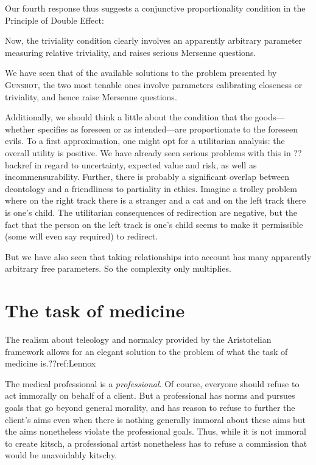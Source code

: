 Our fourth response thus suggests a conjunctive proportionality condition in the Principle of Double Effect:

Now, the triviality condition clearly involves an apparently arbitrary parameter measuring relative triviality, and raises serious 
Mersenne questions. 

We have seen that of the available solutions to the problem presented by \textsc{Gunshot}, the two most tenable ones involve 
parameters calibrating closeness or triviality, and hence raise Mersenne questions.

Additionally, we should think a little about the condition that the goods---whether specifies as foreseen or as intended---are 
proportionate to the foreseen evils. To a first approximation, one might opt for a utilitarian analysis: the overall
utility is positive. We have already seen serious problems with this in ??backref in regard to uncertainty, expected value
and risk, as well as incommensurability. Further, there is probably a significant overlap between deontology and a friendliness
to partiality in ethics. Imagine a trolley problem where on the right track there is a stranger and a cat and on the left track
there is one's child. The utilitarian consequences of redirection are negative, but the fact that the person on the left track
is one's child seems to make it permissible (some will even say required) to redirect. 

But we have also seen that taking relationships into account has many apparently arbitrary free parameters. So 
the complexity only multiplies.

\section{The task of medicine}
The realism about teleology and normalcy provided by the Aristotelian framework
allows for an elegant solution to the problem of what the task of medicine is.??ref:Lennox

The medical professional is a \textit{professional}. Of course, everyone should refuse to act immorally on behalf of a client. But a professional has norms
and pursues goals that go beyond general morality, and has reason to refuse to further the client's aims even when there is nothing generally immoral about
these aims but the aims nonetheless violate the professional goals. Thus, while it is not immoral to create kitsch, a professional artist nonetheless has
to refuse a commission that would be unavoidably kitschy.

